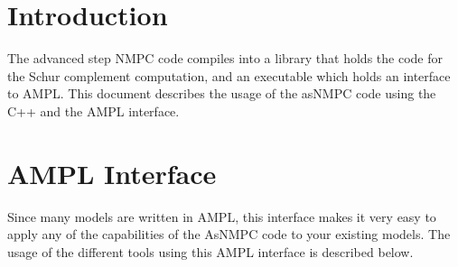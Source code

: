 \documentclass[a4paper]{article}
\begin{document}
\section{Introduction}
The advanced step NMPC code compiles into a library that holds the code for the Schur complement computation, and an executable which holds an interface to AMPL. This document describes the usage of the asNMPC code using the C++ and the AMPL interface. 

\section{AMPL Interface}
Since many models are written in AMPL, this interface makes it very easy to apply any of the capabilities of the AsNMPC code to your existing models. The usage of the different tools using this AMPL interface is described below. 
\end{document}
